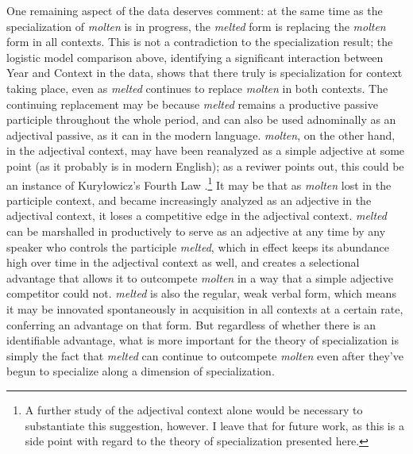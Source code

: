 \documentclass{artikel3}
\begin{document}
One remaining aspect of the data deserves comment: at the same time as the specialization of \textsl{molten} is in progress, the \textsl{melted} form is replacing the \textsl{molten} form in all contexts. This is not a contradiction to the specialization result; the logistic model comparison above, identifying a significant interaction between Year and Context in the data, shows that there truly is specialization for context taking place, even as \textsl{melted} continues to replace \textsl{molten} in both contexts. The continuing replacement may be because \textsl{melted} remains a productive passive participle throughout the whole period, and can also be used adnominally as an adjectival passive, as it can in the modern language.  \textsl{molten}, on the other hand, in the adjectival context, may have been reanalyzed as a simple adjective at some point (as it probably is in modern English); as a reviwer points out, this could be an instance of Kuryłowicz's Fourth Law \citep{kurylowicz1945}.\footnote{A further study of the adjectival context alone would be necessary to substantiate this suggestion, however. I leave that for future work, as this is a side point with regard to the theory of specialization presented here.} It may be that as \textsl{molten} lost in the participle context, and became increasingly analyzed as an adjective in the adjectival context, it loses a competitive edge in the adjectival context. \textsl{melted} can be marshalled in productively to serve as an adjective at any time by any speaker who controls the participle \textsl{melted}, which in effect keeps its abundance high over time in the adjectival context as well, and creates a selectional advantage that allows it to outcompete \textsl{molten} in a way that a simple adjective competitor could not. \textsl{melted} is also the regular, weak verbal form, which means it may be innovated spontaneously in acquisition in all contexts at a certain rate, conferring an advantage on that form. But regardless of whether there is an identifiable advantage, what is more important for the theory of specialization is simply the fact that \textsl{melted} can continue to outcompete \textsl{molten} even after they've begun to specialize along a dimension of specialization.
\end{document}
